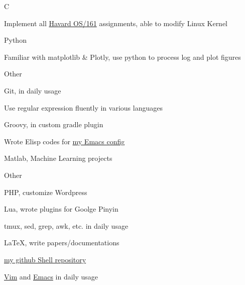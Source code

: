 \cvcomputer
{C}{
\begin{tightitemize}
  \item Implement all \href{http://www.eecs.harvard.edu/~syrah/os161/}{Havard OS/161} assignments,
  able to modify Linux Kernel
\end{tightitemize}
}
{Python}{
\begin{tightitemize}
  \item Familiar with matplotlib \& Plotly, use python to process log and plot figures
\end{tightitemize}
}

\cvcomputer
{Other}{
\begin{tightitemize}
  \item Git, in daily usage\\
  \item Use regular expression fluently in various languages
  \item Groovy, in custom gradle plugin\\
  \item Wrote Elisp codes for \href{https://github.com/xcv58/Emacs_config}{my Emacs config}
  \item Matlab, Machine Learning projects
\end{tightitemize}
}
{Other}{
\begin{tightitemize}
  \item PHP, customize Wordpress\\
  \item Lua, wrote plugins for Goolge Pinyin\\
  \item tmux, sed, grep, awk, etc. in daily usage\\
  \item {\LaTeX}, write papers/documentations
  \item \href{https://github.com/xcv58/Shell_script}{my github Shell repository}
  \item \href{https://github.com/xcv58/Vim_config}{Vim} and \href{https://github.com/xcv58/Emacs_config}{Emacs} in daily usage\\
\end{tightitemize}
}
